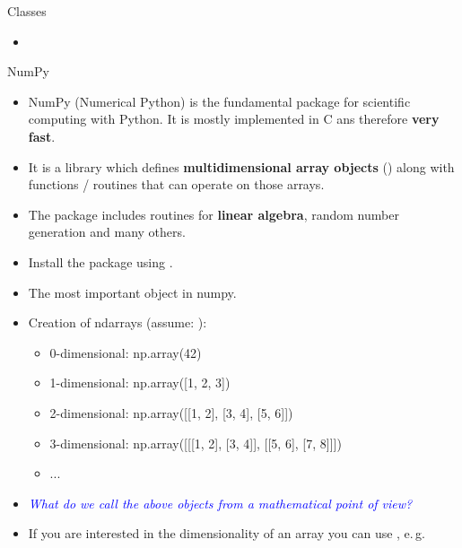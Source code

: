 
\begin{dwHeaderFrame}{Classes}
	\begin{itemize}
		\item
	\end{itemize}
\end{dwHeaderFrame}



\begin{dwHeaderFrame}{NumPy}
	\begin{itemize}
		\item NumPy (Numerical Python) is the fundamental package for scientific computing with Python.
			It is mostly implemented in C ans therefore \textbf{very fast}.
		\item It is a library which defines \textbf{multidimensional array objects} () along with functions / routines
			that can operate on those arrays.
		\item The package includes routines for \textbf{linear algebra}, random number generation and many others.
		\item Install the package using .
	\end{itemize}
\end{dwHeaderFrame}


\begin{frame}
	\begin{itemize}
		\item The most important object in numpy.
		\item Creation of ndarrays (assume: ):
		\begin{itemize}
			\item 0-dimensional: np.array(42)
			\item 1-dimensional: np.array([1, 2, 3])
			\item 2-dimensional: np.array([[1, 2], [3, 4], [5, 6]])
			\item 3-dimensional: np.array([[[1, 2], [3, 4]], [[5, 6], [7, 8]]])
			\item ...
		\end{itemize}
		\item \textcolor{blue}{\textit{What do we call the above objects from a mathematical point of view?}}
		\item If you are interested in the dimensionality of an array you can use , e.\,g. 
	\end{itemize}
\end{frame}


